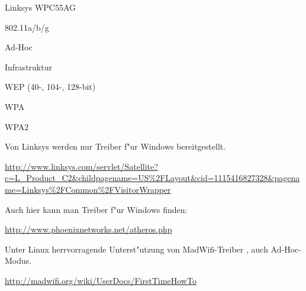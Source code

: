 %
%
\begin{wlandevice}{Linksys WPC55AG}



\begin{wlanieeestandard}
\item 802.11a/b/g
\end{wlanieeestandard}

\begin{wlanmode}
\item Ad-Hoc
\item Infrastruktur
\end{wlanmode}

\begin{wlansecurity}
\item WEP (40-, 104-, 128-bit)
\item WPA
\item WPA2
\end{wlansecurity}

\begin{wlandriver}
\item
Von Linksys werden nur Treiber f"ur Windows bereitgestellt.

\url{http://www.linksys.com/servlet/Satellite?c=L_Product_C2&childpagename=US\%2FLayout&cid=1115416827328&pagename=Linksys\%2FCommon\%2FVisitorWrapper}

Auch hier kann man Treiber f"ur Windows finden:

\url{http://www.phoenixnetworks.net/atheros.php}

Unter Linux herrvorragende Unterst"utzung von MadWifi-Treiber  \cite{madwifi},
auch Ad-Hoc-Modus.
\end{wlandriver}


\begin{wlaninstall}
\item
\url{http://madwifi.org/wiki/UserDocs/FirstTimeHowTo}
\end{wlaninstall}


\end{wlandevice}
